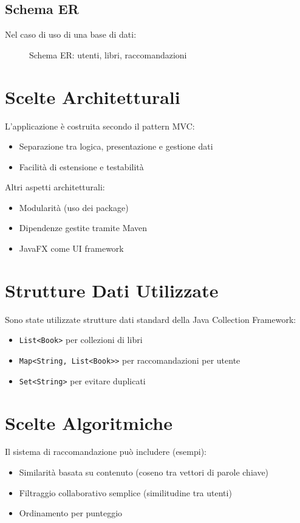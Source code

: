 \documentclass[a4paper,12pt]{article}
\begin{document}
    \subsection{Schema ER}
    Nel caso di uso di una base di dati:
    \begin{figure}[h]
    \centering
    \caption{Schema ER: utenti, libri, raccomandazioni}
    \end{figure}

    \section{Scelte Architetturali}
    L’applicazione è costruita secondo il pattern MVC:
    \begin{itemize}
    \item Separazione tra logica, presentazione e gestione dati
    \item Facilità di estensione e testabilità
    \end{itemize}
    Altri aspetti architetturali:
    \begin{itemize}
    \item Modularità (uso dei package)
    \item Dipendenze gestite tramite Maven
    \item JavaFX come UI framework
    \end{itemize}

    \section{Strutture Dati Utilizzate}
    Sono state utilizzate strutture dati standard della Java Collection Framework:
    \begin{itemize}
    \item \texttt{List<Book>} per collezioni di libri
    \item \texttt{Map<String, List<Book>>} per raccomandazioni per utente
    \item \texttt{Set<String>} per evitare duplicati
    \end{itemize}

    \section{Scelte Algoritmiche}
    Il sistema di raccomandazione può includere (esempi):
    \begin{itemize}
    \item Similarità basata su contenuto (coseno tra vettori di parole chiave)
    \item Filtraggio collaborativo semplice (similitudine tra utenti)
    \item Ordinamento per punteggio
    \end{itemize}
\end{document}
